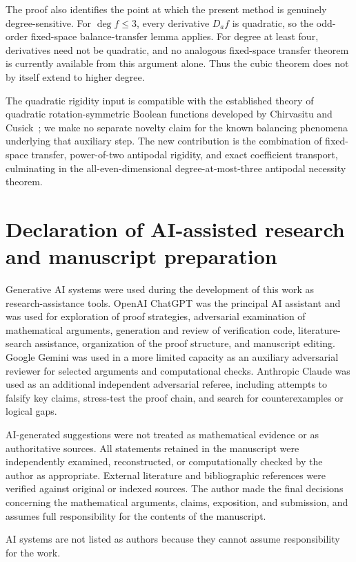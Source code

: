\documentclass[11pt,a4paper]{article}
\theoremstyle{remark}
\theoremstyle{plain}
\begin{document}
The proof also identifies the point at which the present method is genuinely degree-sensitive. For $\deg f\le3$, every derivative $D_af$ is quadratic, so the odd-order fixed-space balance-transfer lemma applies. For degree at least four, derivatives need not be quadratic, and no analogous fixed-space transfer theorem is currently available from this argument alone. Thus the cubic theorem does not by itself extend to higher degree.

The quadratic rigidity input is compatible with the established theory of quadratic rotation-symmetric Boolean functions developed by Chirvasitu and Cusick~\cite{chircusick}; we make no separate novelty claim for the known balancing phenomena underlying that auxiliary step. The new contribution is the combination of fixed-space transfer, power-of-two antipodal rigidity, and exact coefficient transport, culminating in the all-even-dimensional degree-at-most-three antipodal necessity theorem.

\section*{Declaration of AI-assisted research and manuscript preparation}
Generative AI systems were used during the development of this work as research-assistance tools. OpenAI ChatGPT was the principal AI assistant and was used for exploration of proof strategies, adversarial examination of mathematical arguments, generation and review of verification code, literature-search assistance, organization of the proof structure, and manuscript editing. Google Gemini was used in a more limited capacity as an auxiliary adversarial reviewer for selected arguments and computational checks. Anthropic Claude was used as an additional independent adversarial referee, including attempts to falsify key claims, stress-test the proof chain, and search for counterexamples or logical gaps.

AI-generated suggestions were not treated as mathematical evidence or as authoritative sources. All statements retained in the manuscript were independently examined, reconstructed, or computationally checked by the author as appropriate. External literature and bibliographic references were verified against original or indexed sources. The author made the final decisions concerning the mathematical arguments, claims, exposition, and submission, and assumes full responsibility for the contents of the manuscript.

AI systems are not listed as authors because they cannot assume responsibility for the work.
\end{document}
